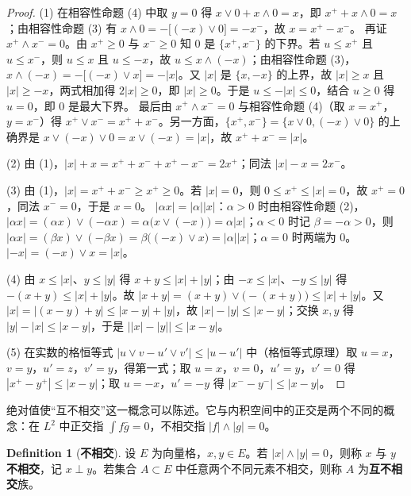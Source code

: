 \documentclass[oneside]{book}
\theoremstyle{definition}
\theoremstyle{definition}
\newtheorem{definition}{Definition}[section]
\begin{document}
	\begin{proof}
		(1) 在相容性命题 (4) 中取 $y=0$ 得 $x\vee0+x\wedge0=x$，即 $x^{+}+x\wedge0=x$；由相容性命题 (3) 有 $x\wedge0=-\big[(-x)\vee0\big]=-x^{-}$，故 $x=x^{+}-x^{-}$。
		再证 $x^{+}\wedge x^{-}=0$。由 $x^{+}\geqslant0$ 与 $x^{-}\geqslant0$ 知 $0$ 是 $\{x^{+},x^{-}\}$ 的下界。若 $u\leqslant x^{+}$ 且 $u\leqslant x^{-}$，则 $u\leqslant x$ 且 $u\leqslant-x$，故 $u\leqslant x\wedge(-x)$；由相容性命题 (3)，$x\wedge(-x)=-\big[(-x)\vee x\big]=-|x|$。又 $|x|$ 是 $\{x,-x\}$ 的上界，故 $|x|\geqslant x$ 且 $|x|\geqslant-x$，两式相加得 $2|x|\geqslant0$，即 $|x|\geqslant0$。于是 $u\leqslant-|x|\leqslant0$，结合 $u\geqslant0$ 得 $u=0$，即 $0$ 是最大下界。
		最后由 $x^{+}\wedge x^{-}=0$ 与相容性命题 (4)（取 $x=x^{+}$，$y=x^{-}$）得 $x^{+}\vee x^{-}=x^{+}+x^{-}$。另一方面，$\{x^{+},x^{-}\}=\{x\vee0,(-x)\vee0\}$ 的上确界是 $x\vee(-x)\vee0=x\vee(-x)=|x|$，故 $x^{+}+x^{-}=|x|$。
		
		(2) 由 (1)，$|x|+x=x^{+}+x^{-}+x^{+}-x^{-}=2x^{+}$；同法 $|x|-x=2x^{-}$。
		
		(3) 由 (1)，$|x|=x^{+}+x^{-}\geqslant x^{+}\geqslant0$。若 $|x|=0$，则 $0\leqslant x^{+}\leqslant|x|=0$，故 $x^{+}=0$，同法 $x^{-}=0$，于是 $x=0$。
		$|\alpha x|=|\alpha||x|$：$\alpha>0$ 时由相容性命题 (2)，$|\alpha x|=(\alpha x)\vee(-\alpha x)=\alpha\big(x\vee(-x)\big)=\alpha|x|$；$\alpha<0$ 时记 $\beta=-\alpha>0$，则 $|\alpha x|=(\beta x)\vee(-\beta x)=\beta\big((-x)\vee x\big)=|\alpha||x|$；$\alpha=0$ 时两端为 $0$。$|-x|=(-x)\vee x=|x|$。
		
		(4) 由 $x\leqslant|x|$、$y\leqslant|y|$ 得 $x+y\leqslant|x|+|y|$；由 $-x\leqslant|x|$、$-y\leqslant|y|$ 得 $-(x+y)\leqslant|x|+|y|$。故 $|x+y|=(x+y)\vee\big(-(x+y)\big)\leqslant|x|+|y|$。又 $|x|=|(x-y)+y|\leqslant|x-y|+|y|$，故 $|x|-|y|\leqslant|x-y|$；交换 $x,y$ 得 $|y|-|x|\leqslant|x-y|$，于是 $\big||x|-|y|\big|\leqslant|x-y|$。
		
		(5) 在实数的格恒等式 $|u\vee v-u'\vee v'|\leqslant|u-u'|$ 中（格恒等式原理）取 $u=x$，$v=y$，$u'=z$，$v'=y$，得第一式；取 $u=x$，$v=0$，$u'=y$，$v'=0$ 得 $|x^{+}-y^{+}|\leqslant|x-y|$；取 $u=-x$，$u'=-y$ 得 $|x^{-}-y^{-}|\leqslant|x-y|$。
	\end{proof}
	
	绝对值使“互不相交”这一概念可以陈述。它与内积空间中的正交是两个不同的概念：在 $L^{2}$ 中正交指 $\int f\bar g=0$，不相交指 $|f|\wedge|g|=0$。
	
	\begin{definition}[\bfseries{不相交}]
		设 $E$ 为向量格，$x,y\in E$。若 $|x|\wedge|y|=0$，则称 $x$ 与 $y$ \textbf{不相交}，记 $x\perp y$。若集合 $A\subset E$ 中任意两个不同元素不相交，则称 $A$ 为\textbf{互不相交}族。
	\end{definition}
	
\end{document}
